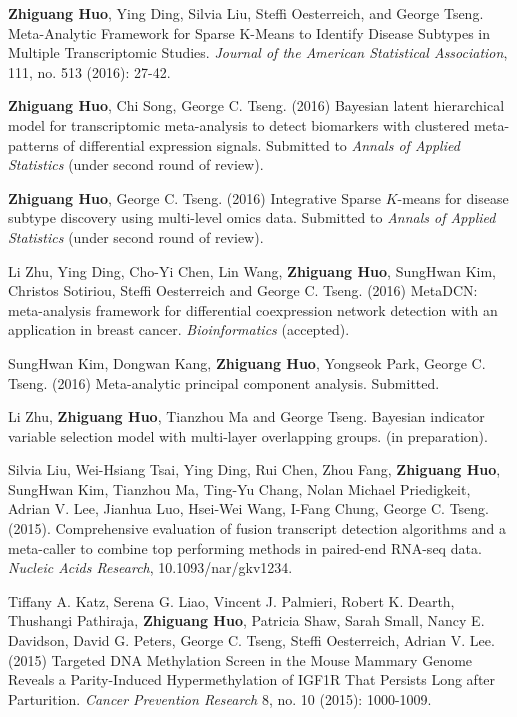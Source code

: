 \documentclass[a4paper, 10pt]{article}
\begin{document}
\begin{thebibliography}{9}
{\bf Zhiguang Huo}, Ying Ding, Silvia Liu, Steffi Oesterreich, and George Tseng. Meta-Analytic Framework for Sparse K-Means to Identify Disease Subtypes in Multiple Transcriptomic Studies. \emph{Journal of the American Statistical Association},  111, no. 513 (2016): 27-42.
 
{\bf Zhiguang Huo}, Chi Song, George C. Tseng. (2016)
Bayesian latent hierarchical model for transcriptomic meta-analysis to detect biomarkers with clustered meta-patterns of differential expression signals. Submitted to \emph{Annals of Applied Statistics} (under second round of review).

{\bf Zhiguang Huo}, George C. Tseng. (2016)
Integrative Sparse $K$-means for disease subtype discovery using multi-level omics data.
Submitted to \emph{Annals of Applied Statistics} (under second round of review).

Li Zhu, Ying Ding, Cho-Yi Chen, Lin Wang, {\bf Zhiguang Huo}, SungHwan Kim, Christos Sotiriou, Steffi Oesterreich and George C. Tseng. (2016)
MetaDCN: meta-analysis framework for differential coexpression network detection with an application in breast cancer.
\emph{Bioinformatics} (accepted).

SungHwan Kim, Dongwan Kang, {\bf Zhiguang Huo}, Yongseok
Park, George C. Tseng. (2016)
Meta-analytic principal component analysis.
Submitted.

Li Zhu, {\bf Zhiguang Huo}, Tianzhou Ma and George Tseng. 
Bayesian indicator variable selection model with multi-layer overlapping groups.
(in preparation).

Silvia Liu, Wei-Hsiang Tsai, Ying Ding, Rui Chen, Zhou Fang, {\bf Zhiguang Huo}, SungHwan Kim, Tianzhou Ma, Ting-Yu Chang, Nolan Michael Priedigkeit, Adrian V. Lee, Jianhua Luo, Hsei-Wei Wang, I-Fang Chung, George C. Tseng. (2015).
Comprehensive evaluation of fusion transcript detection algorithms and a meta-caller to combine top performing methods in paired-end RNA-seq data.
\emph{Nucleic Acids Research}, 10.1093/nar/gkv1234.
 
 Tiffany A. Katz, Serena G. Liao, Vincent J. Palmieri, Robert K. Dearth, Thushangi Pathiraja, {\bf Zhiguang Huo}, Patricia Shaw, Sarah Small, Nancy E. Davidson, David G. Peters, George C. Tseng, Steffi Oesterreich, Adrian V. Lee. (2015) Targeted DNA Methylation Screen in the Mouse Mammary Genome Reveals a Parity-Induced Hypermethylation of IGF1R That Persists Long after Parturition. \emph{Cancer Prevention Research} 8, no. 10 (2015): 1000-1009.


\end{thebibliography}
\end{document}
